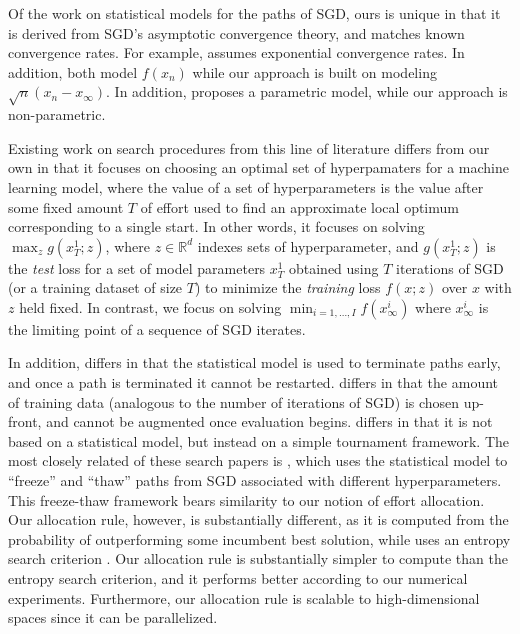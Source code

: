 \documentclass[12pt,english]{article}
\newcommand{\stedit}[1]{{\color{blue} #1}}
\begin{document}
Of the work on statistical models for the paths of SGD, ours is unique in that it is derived from SGD's asymptotic convergence theory, and matches known convergence rates.  For example, \cite{Swersky:2014} assumes exponential convergence rates.
In addition, \cite{Swersky:2014,Hutter:2015} both model $f(x_{n})$ while our approach is built on modeling $\sqrt{n}(x_{n}-x_{\infty})$.  In addition, \cite{Hutter:2015} proposes a parametric model, while our approach is non-parametric.


Existing work on search procedures from this line of literature differs from our own in that it focuses on choosing an optimal set of hyperpamaters for a machine learning model, where the value of a set of hyperparameters is the value after some fixed amount $T$ of effort used to find an approximate local optimum corresponding to a single start.  In other words, it focuses on solving $\max_z g(x^1_T;z)$, where $z\in\mathbb{R}^d$ indexes sets of hyperparameter, and $g(x^1_T;z)$ is the {\it test} loss for a set of model parameters $x^1_T$ obtained using $T$ iterations of SGD (or a training dataset of size $T$) to minimize the {\it training} loss $f(x;z)$ over $x$ with $z$ held fixed.  In contrast, we focus on solving $\min_{i=1,\ldots,I} f(x^i_\infty)$ where $x^i_\infty$ is the limiting point of a sequence of SGD iterates. 

In addition, \cite{Hutter:2015} differs in that the statistical model is used to terminate paths early, and once a path is terminated it cannot be restarted. \cite{klein2016fast} differs in that the amount of training data (analogous to the number of iterations of SGD) is chosen up-front, and cannot be augmented once evaluation begins. \cite{li2016}  differs in that it is not based on a statistical model, but instead on a simple tournament framework.
The most closely related of these search papers is \cite{Swersky:2014}, which uses the statistical model to ``freeze'' and ``thaw'' paths from SGD associated with different hyperparameters.  This freeze-thaw framework bears similarity to our notion of effort allocation.  Our allocation rule, however, is substantially different, as it is computed from the probability of outperforming some incumbent best solution, while \cite{Swersky:2014} uses an entropy search criterion \citep{entropySearch}.  \stedit{Our allocation rule is substantially simpler to compute than the entropy search criterion, and it performs better according to our numerical experiments. Furthermore, our allocation rule is scalable to high-dimensional spaces since it can be parallelized.}
\end{document}
